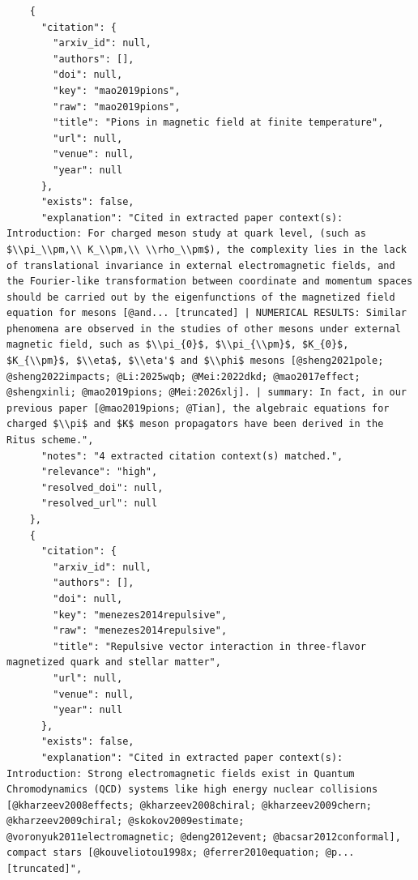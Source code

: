 \documentclass[11pt]{article}
\begin{document}
\begin{verbatim}
    {
      "citation": {
        "arxiv_id": null,
        "authors": [],
        "doi": null,
        "key": "mao2019pions",
        "raw": "mao2019pions",
        "title": "Pions in magnetic field at finite temperature",
        "url": null,
        "venue": null,
        "year": null
      },
      "exists": false,
      "explanation": "Cited in extracted paper context(s): Introduction: For charged meson study at quark level, (such as $\\pi_\\pm,\\ K_\\pm,\\ \\rho_\\pm$), the complexity lies in the lack of translational invariance in external electromagnetic fields, and the Fourier-like transformation between coordinate and momentum spaces should be carried out by the eigenfunctions of the magnetized field equation for mesons [@and... [truncated] | NUMERICAL RESULTS: Similar phenomena are observed in the studies of other mesons under external magnetic field, such as $\\pi_{0}$, $\\pi_{\\pm}$, $K_{0}$, $K_{\\pm}$, $\\eta$, $\\eta'$ and $\\phi$ mesons [@sheng2021pole; @sheng2022impacts; @Li:2025wqb; @Mei:2022dkd; @mao2017effect; @shengxinli; @mao2019pions; @Mei:2026xlj]. | summary: In fact, in our previous paper [@mao2019pions; @Tian], the algebraic equations for charged $\\pi$ and $K$ meson propagators have been derived in the Ritus scheme.",
      "notes": "4 extracted citation context(s) matched.",
      "relevance": "high",
      "resolved_doi": null,
      "resolved_url": null
    },
    {
      "citation": {
        "arxiv_id": null,
        "authors": [],
        "doi": null,
        "key": "menezes2014repulsive",
        "raw": "menezes2014repulsive",
        "title": "Repulsive vector interaction in three-flavor magnetized quark and stellar matter",
        "url": null,
        "venue": null,
        "year": null
      },
      "exists": false,
      "explanation": "Cited in extracted paper context(s): Introduction: Strong electromagnetic fields exist in Quantum Chromodynamics (QCD) systems like high energy nuclear collisions [@kharzeev2008effects; @kharzeev2008chiral; @kharzeev2009chern; @kharzeev2009chiral; @skokov2009estimate; @voronyuk2011electromagnetic; @deng2012event; @bacsar2012conformal], compact stars [@kouveliotou1998x; @ferrer2010equation; @p... [truncated]",

\end{verbatim}
\end{document}
